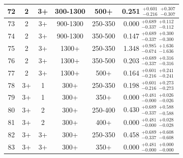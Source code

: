 \begin{table}[htbp]
\begin{centering}
\begin{tabular}{|c|c|c|c|c||c|}
 \hline
             72 &               2 &              3+ &        300-1300 &            500+ & 0.251 $^{+0.601}_{-0.216}$  $^{+0.307}_{-0.307}$  \\
 \hline
             73 &               2 &              3+ &        900-1300 &         250-350 & 0.000 $^{+0.689}_{-0.337}$  $^{+0.112}_{-0.112}$  \\
 \hline
             74 &               2 &              3+ &        900-1300 &         350-500 & 0.147 $^{+0.689}_{-0.337}$  $^{+0.300}_{-0.300}$  \\
 \hline
             75 &               2 &              3+ &           1300+ &         250-350 & 1.348 $^{+0.985}_{-0.674}$  $^{+1.636}_{-1.636}$  \\
 \hline
             76 &               2 &              3+ &           1300+ &         350-500 & 0.203 $^{+0.689}_{-0.337}$  $^{+0.316}_{-0.316}$  \\
 \hline
             77 &               2 &              3+ &           1300+ &            500+ & 0.164 $^{+0.601}_{-0.216}$  $^{+0.241}_{-0.241}$  \\
 \hline
             78 &              3+ &               1 &            300+ &         250-350 & 0.198 $^{+0.601}_{-0.216}$  $^{+0.273}_{-0.273}$  \\
 \hline
             79 &              3+ &               1 &            300+ &            350+ & 0.000 $^{+0.481}_{-0.000}$  $^{+0.026}_{-0.026}$  \\
 \hline
             80 &              3+ &               2 &            300+ &         250-400 & 0.430 $^{+0.689}_{-0.337}$  $^{+0.588}_{-0.588}$  \\
 \hline
             81 &              3+ &               2 &            300+ &            400+ & 0.000 $^{+0.481}_{-0.000}$  $^{+0.028}_{-0.028}$  \\
 \hline
             82 &              3+ &              3+ &            300+ &         250-350 & 0.458 $^{+0.689}_{-0.337}$  $^{+0.608}_{-0.608}$  \\
 \hline
             83 &              3+ &              3+ &            300+ &            350+ & 0.000 $^{+0.481}_{-0.000}$  $^{+0.000}_{-0.000}$  \\
 \hline

\end{tabular}
\par\end{centering}
\end{table}
